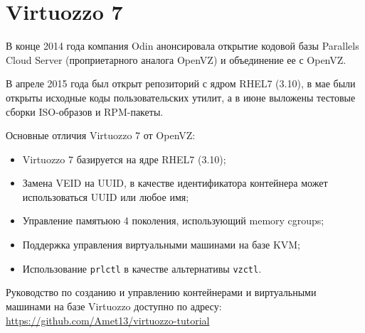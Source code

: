 \section{Virtuozzo 7}

В конце 2014 года компания Odin анонсировала открытие кодовой базы Parallels Cloud Server (проприетарного аналога OpenVZ) и объединение ее с OpenVZ.

В апреле 2015 года был открыт репозиторий с ядром RHEL7 (3.10), в мае были открыты исходные коды пользовательских утилит, а в июне выложены тестовые сборки ISO-образов и RPM-пакеты.

Основные отличия Virtuozzo 7 от OpenVZ:
\begin{itemize}
    \item Virtuozzo 7 базируется на ядре RHEL7 (3.10);
    \item Замена VEID на UUID, в качестве идентификатора контейнера может использоваться UUID или любое имя;
    \item Управление памятьюю 4 поколения, использующий memory cgroups;
    \item Поддержка управления виртуальными машинами на базе KVM;
    \item Использование \texttt{prlctl} в качестве альтернативы \texttt{vzctl}.
\end{itemize}

Руководство по созданию и управлению контейнерами и виртуальными машинами на базе Virtuozzo доступно по адресу: \url{https://github.com/Amet13/virtuozzo-tutorial}

\clearpage
